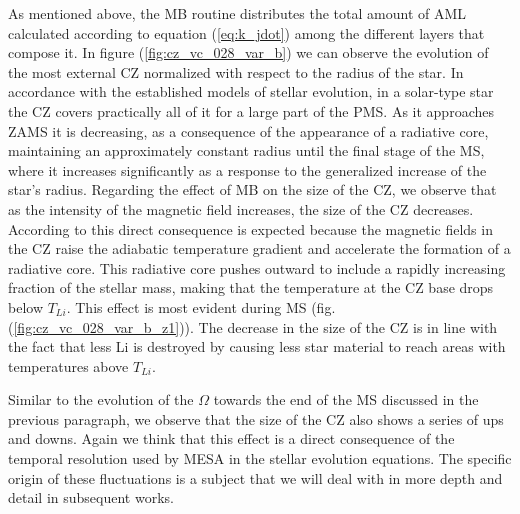 \documentclass[fleqn,usenatbib]{mnras}
\begin{document}
As mentioned above, the MB routine distributes the total amount of AML calculated according to equation (\ref{eq:k_jdot}) among the different layers that compose it. In figure (\ref{fig:cz_vc_028_var_b}) we can observe the evolution of the most external CZ normalized with respect to the radius of the star. In accordance with the established models of stellar evolution, in a solar-type star the CZ covers practically all of it for a large part of the PMS. As it approaches ZAMS it is decreasing, as a consequence of the appearance of a radiative core, maintaining an approximately constant radius until the final stage of the MS, where it increases significantly as a response to the generalized increase of the star's radius. Regarding the effect of MB on the size of the CZ, we observe that as the intensity of the magnetic field increases, the size of the CZ decreases. According to \citet{Jeffries2004} this direct consequence is expected because the magnetic fields in the CZ raise the adiabatic temperature gradient and accelerate the formation of a radiative core. This radiative core pushes outward to include a rapidly increasing fraction of the stellar mass, making that the temperature at the CZ base drops below $T_{Li}$. This effect is most evident during MS (fig. (\ref{fig:cz_vc_028_var_b_z1})). The decrease in the size of the CZ is in line with the fact that less Li is destroyed by causing less star material to reach areas with temperatures above $T_{Li}$.\par

Similar to the evolution of the $\Omega$ towards the end of the MS discussed in the previous paragraph, we observe that the size of the CZ also shows a series of ups and downs. Again we think that this effect is a direct consequence of the temporal resolution used by MESA in the stellar evolution equations. The specific origin of these fluctuations is a subject that we will deal with in more depth and detail in subsequent works.\par
\end{document}
